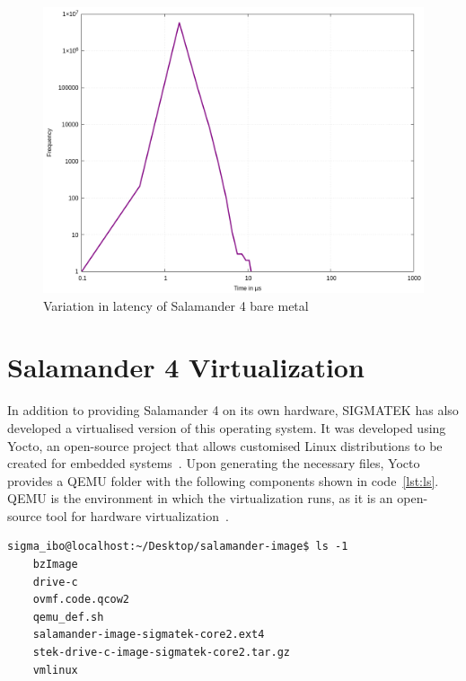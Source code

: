 \documentclass[MMR,Master,english]{twbook}
\begin{document}
\begin{figure}[H]
	\centering
	\includegraphics[width=0.7\columnwidth]{masterthesis-documentation/docs/sigmatek/xenomai/0hardware/gnuplot_max_latency_hardware.png}
	\caption[Variation in latency of Salamander 4 bare metal]{Variation in latency of Salamander 4 bare metal}
	\label{fig:gnuplot_max_latency_hardware}
\end{figure}


\section{Salamander 4 Virtualization}\label{sec:salamander4-virtualization}
In addition to providing Salamander 4 on its own hardware, SIGMATEK has also developed a virtualised version of this operating system. It was developed using Yocto, an open-source project that allows customised Linux distributions to be created for embedded systems~\cite{WelcomeYoctoProject}. Upon generating the necessary files, Yocto provides a QEMU folder with the following components shown in code~\ref{lst:ls}. QEMU is the environment in which the virtualization runs, as it is an open-source tool for hardware virtualization~\cite{QEMU}.

\vspace{1em}
\begin{minipage}{\linewidth}
	\begin{lstlisting}[name={Contents of QEMU folder for Salamander 4},label={lst:ls}]
    sigma_ibo@localhost:~/Desktop/salamander-image$ ls -1
    bzImage
    drive-c
    ovmf.code.qcow2
    qemu_def.sh
    salamander-image-sigmatek-core2.ext4
    stek-drive-c-image-sigmatek-core2.tar.gz
    vmlinux
    \end{lstlisting}
\end{minipage}
\end{document}

